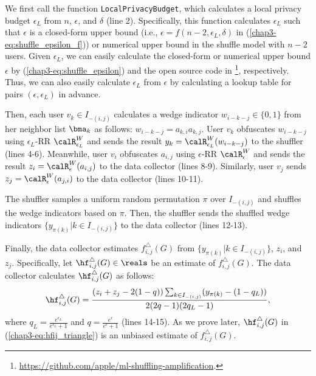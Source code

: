 We first call the function \texttt{LocalPrivacyBudget}, which calculates a local privacy budget $\epsilon_L$ from $n$, $\epsilon$, and $\delta$ (line 2). 
Specifically, this function calculates $\epsilon_L$ 
such that $\epsilon$ is a closed-form upper bound (i.e., $\epsilon = f(n-2, \epsilon_L, \delta)$ in (\ref{chap3-eq:shuffle_epsilon_f})) or numerical upper bound in the shuffle model with $n-2$ users. 
Given $\epsilon_L$, we can easily calculate the closed-form or numerical upper bound $\epsilon$ by (\ref{chap3-eq:shuffle_epsilon}) and the open source code in \cite{Feldman_FOCS21}\footnote{\url{https://github.com/apple/ml-shuffling-amplification}.}, respectively. 
Thus, we can also easily calculate $\epsilon_L$ from $\epsilon$ by calculating a lookup table for pairs $(\epsilon, \epsilon_L)$ in advance. 

Then, each user $v_k \in I_{-(i,j)}$ calculates a wedge indicator $w_{i-k-j} \in \{0,1\}$ from her neighbor list $\bma_k$ as follows: $w_{i-k-j} = a_{k,i} a_{k,j}$. 
User $v_k$ obfuscates $w_{i-k-j}$ using $\epsilon_L$-RR $\calR_{\epsilon_L}^W$ and sends the result $y_k = \calR_{\epsilon_L}^W(w_{i-k-j})$ to the shuffler (lines 4-6). 
Meanwhile, user $v_i$ obfuscates $a_{i,j}$ using $\epsilon$-RR $\calR_{\epsilon}^W$ and sends the result $z_i = \calR_{\epsilon}^W(a_{i,j})$ to the data collector 
(lines 8-9). 
Similarly, user $v_j$ sends $z_j = \calR_{\epsilon}^W(a_{j,i})$ to the data collector (lines 10-11). 

The shuffler samples a uniform random permutation $\pi$ over $I_{-(i,j)}$ and shuffles the wedge indicators based on $\pi$. 
Then, the shuffler sends the shuffled wedge indicators $\{y_{\pi(k)} | k \in I_{-(i,j)}\}$ to the data collector (lines 12-13). 

Finally, the data collector estimates $f_{i,j}^\triangle(G)$ from $\{y_{\pi(k)} | k \in I_{-(i,j)}\}$, $z_i$, and $z_j$. 
Specifically, let $\hf_{i,j}^\triangle(G) \in \reals$ be an estimate of $f_{i,j}^\triangle(G)$. 
The data collector calculates $\hf_{i,j}^\triangle(G)$ as follows: 
\begin{align}
    \hf_{i,j}^\triangle(G) = \frac{(z_i+z_j-2(1-q))\sum_{k \in I_{-(i,j)}} (y_{\pi(k)} - (1-q_L))}{2(2q-1)(2q_L-1)},
    \label{chap3-eq:hfij_triangle}
\end{align}
where $q_L = \frac{e^{\epsilon_L}}{e^{\epsilon_L}+1}$ and $q = \frac{e^\epsilon}{e^\epsilon+1}$ (lines 14-15). 
As we prove later, $\hf_{i,j}^\triangle(G)$ in (\ref{chap3-eq:hfij_triangle}) is an unbiased estimate of $f_{i,j}^\triangle(G)$. 

